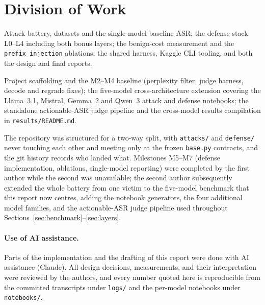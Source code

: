 \documentclass[11pt,a4paper]{article}
\begin{document}
\section{Division of Work}

\begin{description}[leftmargin=0pt, style=nextline, itemsep=6pt,
  font=\normalfont\bfseries\color{attackred}]
  \item[Khalid Hasan Tuhin (2105002)] Attack battery, datasets and the single-model baseline
    ASR; the defense stack L0--L4 including both bonus layers; the benign-cost measurement and
    the \texttt{prefix\_injection} ablations; the shared harness, Kaggle CLI tooling, and both
    the design and final reports.
  \item[Mehemud Azad (2105014)] Project scaffolding and the M2--M4 baseline (perplexity filter,
    judge harness, decode and regrade fixes); the five-model cross-architecture extension
    covering the Llama~3.1, Mistral, Gemma~2 and Qwen~3 attack and defense notebooks; the standalone
    actionable-ASR judge pipeline and the cross-model results compilation in
    \texttt{results/README.md}.
\end{description}

\noindent The repository was structured for a two-way split, with \texttt{attacks/} and \texttt{defense/} never touching each other and meeting only at the frozen \texttt{base.py} contracts, and the git history records who landed what. Milestones M5--M7 (defense implementation, ablations, single-model reporting) were completed by the first author while the second was unavailable; the second author subsequently extended the whole battery from one victim to the five-model benchmark that this report now centres, adding the notebook generators, the four additional model families, and the actionable-ASR judge pipeline used throughout Sections~\ref{sec:benchmark}--\ref{sec:layers}.

\paragraph{Use of AI assistance.} Parts of the implementation and the drafting of this report were done with AI assistance (Claude). All design decisions, measurements, and their interpretation were reviewed by the authors, and every number quoted here is reproducible from the committed transcripts under \texttt{logs/} and the per-model notebooks under \texttt{notebooks/}.
\end{document}

